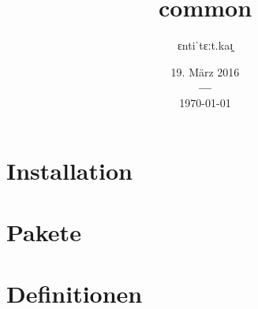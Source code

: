 \documentclass[a4paper,12pt]{article}
\title{\fontspec{Times New Roman}common}
\title{\fontspec{Times New Roman}\common}
\author{\fontspec{Times New Roman}ɛntiˈtɛːt.kaɪ̯}
\date{%
			{\fontspec{Times New Roman}19. März 2016} \\
			{\bf---} \\[0.2\baselineskip]
			\fontspec{Times New Roman}\today}
\begin{document}
		\listoftodos

		


		\maketitle



		

		\tableofcontents  %
		\tableofcontents    %
		\listoffigures      %
		\listoftables       %
		\lstlistoflistings  %



		\chapter{Installation}
		\chapter{Pakete}
		\chapter{Definitionen}



		\printindex


		\appendix

		
\end{document}
